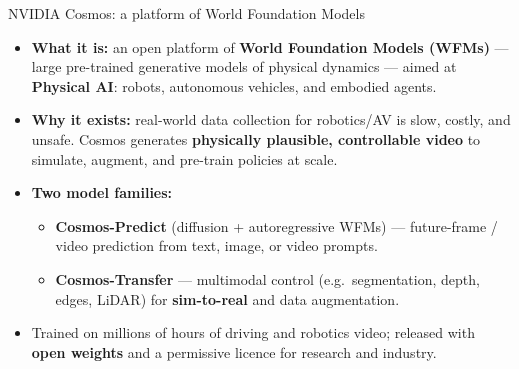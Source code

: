 \begin{frame}[t]{NVIDIA Cosmos: a platform of World Foundation Models}
  \begin{itemize}\itemsep0.30em
    \item \textbf{What it is:} an open platform of \textbf{World Foundation Models (WFMs)} ---
          large pre-trained generative models of physical dynamics --- aimed at
          \textbf{Physical AI}: robots, autonomous vehicles, and embodied agents.
    \item \textbf{Why it exists:} real-world data collection for robotics/AV is slow, costly,
          and unsafe. Cosmos generates \textbf{physically plausible, controllable video}
          to simulate, augment, and pre-train policies at scale.
    \item \textbf{Two model families:}
      \begin{itemize}\itemsep0.18em
        \item \textbf{Cosmos-Predict} (diffusion + autoregressive WFMs) --- future-frame /
              video prediction from text, image, or video prompts.
        \item \textbf{Cosmos-Transfer} --- multimodal control (e.g.\ segmentation, depth,
              edges, LiDAR) for \textbf{sim-to-real} and data augmentation.
      \end{itemize}
    \item Trained on millions of hours of driving and robotics video; released with
          \textbf{open weights} and a permissive licence for research and industry.
  \end{itemize}
\end{frame}

